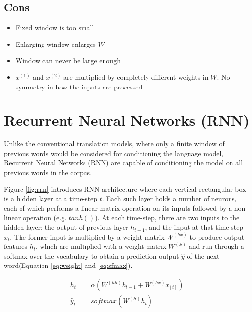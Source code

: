 \documentclass[letterpaper]{article}
\begin{document}
\subsection{Cons}
\begin{itemize}
	\item Fixed window is too small
	\item Enlarging window enlarges $W$
	\item Window can never be large enough
	\item $x^{(1)}$ and $x^{(2)}$ are multiplied by completely different
	weights in $W$. No symmetry in how the inputs are processed.
\end{itemize}

\section{Recurrent Neural Networks (RNN)}
Unlike the conventional translation models, where only a finite
window of previous words would be considered for conditioning
the language model, Recurrent Neural Networks (RNN) are capable
of conditioning the model on all previous words in the corpus.

Figure \ref{fig:rnn} introduces RNN architecture where each
vertical rectangular box is a hidden layer at a time-step $t$.
Each such layer holds a number of neurons, each of which performs
a linear matrix operation on its inputs followed by a non-linear
operation (e.g. $tanh()$). At each time-step, there are two inputs
to the hidden layer: the output of previous layer $h_{t-1}$, and
the input at that time-step $x_t$. The former input is multiplied
by a weight matrix $W^{(hx)}$ to produce output features $h_t$,
which are multiplied with a weight matrix $W^{(S)}$ and run through
a softmax over the vocabulary to obtain a prediction output $\hat{y}$
of the next word(Equation \ref{eq:weight} and \ref{eq:sfmax}).

\begin{align}
	h_t &= \alpha(W^{(hh)}h_{t-1} + W^{(hx)}x_{[t]}) \label{eq:weight} \\
	\hat{y}_{t} &= softmax(W^{(S)}h_t) \label{eq:sfmax}
\end{align}
\end{document}
